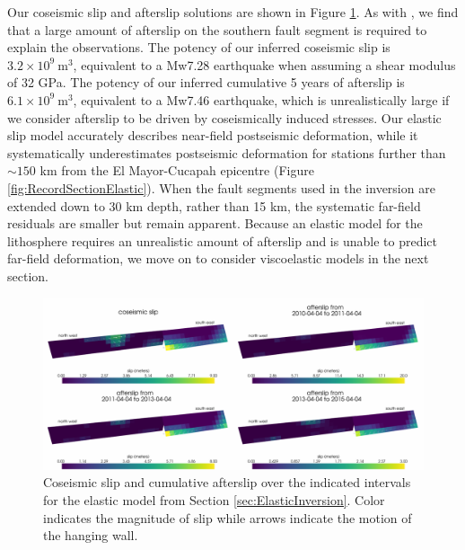 \documentclass[review]{elsarticle}
\begin{document}
Our coseismic slip and afterslip solutions are shown in Figure \ref{fig:ElasticSlip}.  As with \citet{Rollins2015}, we find that a large amount of afterslip on the southern fault segment is required to explain the observations. The potency of our inferred coseismic slip is $3.2\times10^9\ \mathrm{m}^3$, equivalent to a Mw7.28 earthquake when assuming a shear modulus of 32 GPa.  The potency of our inferred cumulative 5 years of afterslip is $6.1\times10^9\ \mathrm{m}^3$, equivalent to a Mw7.46 earthquake, which is unrealistically large if we consider afterslip to be driven by coseismically induced stresses.  Our elastic slip model accurately describes near-field postseismic deformation, while it systematically underestimates postseismic deformation for stations further than $\sim150$ km from the El Mayor-Cucapah epicentre (Figure \ref{fig:RecordSectionElastic}).  When the fault segments used in the inversion are extended down to 30 km depth, rather than 15 km, the systematic far-field residuals are smaller but remain apparent. Because an elastic model for the lithosphere requires an unrealistic amount of afterslip and is unable to predict far-field deformation, we move on to consider viscoelastic models in the next section.  

\begin{figure}
\includegraphics[scale=0.7]{Figures/ElasticSlip}
\caption{Coseismic slip and cumulative afterslip over the indicated intervals for the elastic model from Section \ref{sec:ElasticInversion}.  Color indicates the magnitude of slip while arrows indicate the motion of the hanging wall.}
\label{fig:ElasticSlip}
\end{figure}
\end{document}
